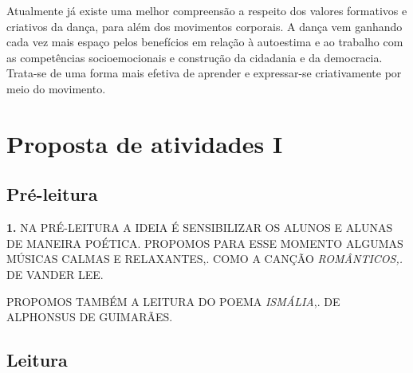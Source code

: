 \documentclass[12pt]{extarticle}
\begin{document}
Atualmente já existe uma melhor compreensão a respeito dos valores formativos e
criativos da dança, para além dos movimentos corporais. A dança vem ganhando
cada vez mais espaço pelos benefícios em relação à autoestima e ao trabalho com
as competências socioemocionais e construção da cidadania e da democracia.
Trata-se de uma forma mais efetiva de aprender e expressar-se criativamente por
meio do movimento. 




\section{Proposta de atividades I}

\subsection{Pré-leitura}






\textbf{1.} NA PRÉ-LEITURA A IDEIA É SENSIBILIZAR OS ALUNOS E ALUNAS DE MANEIRA
POÉTICA. PROPOMOS PARA ESSE MOMENTO ALGUMAS MÚSICAS CALMAS E RELAXANTES,. COMO
A CANÇÃO \emph{ROMÂNTICOS,.} DE VANDER LEE.

PROPOMOS TAMBÉM A LEITURA DO POEMA \emph{ISMÁLIA},. DE ALPHONSUS DE GUIMARÃES.

\subsection{Leitura}
\end{document}
